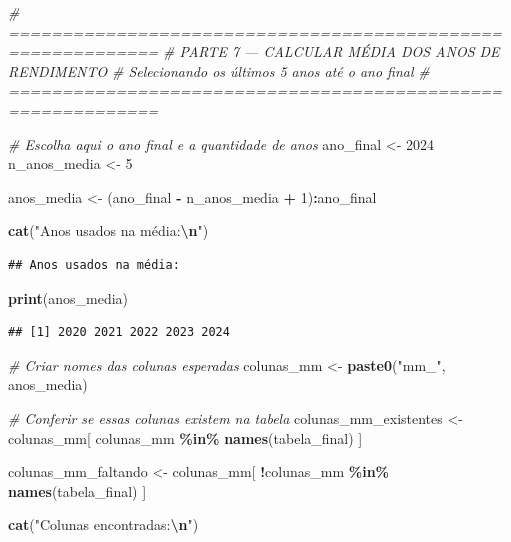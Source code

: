 \documentclass[
]{article}
\newenvironment{Shaded}{\begin{snugshade}}{\end{snugshade}}
\newcommand{\CommentTok}[1]{\textcolor[rgb]{0.56,0.35,0.01}{\textit{#1}}}
\newcommand{\DecValTok}[1]{\textcolor[rgb]{0.00,0.00,0.81}{#1}}
\newcommand{\FunctionTok}[1]{\textcolor[rgb]{0.13,0.29,0.53}{\textbf{#1}}}
\newcommand{\NormalTok}[1]{#1}
\newcommand{\OtherTok}[1]{\textcolor[rgb]{0.56,0.35,0.01}{#1}}
\newcommand{\SpecialCharTok}[1]{\textcolor[rgb]{0.81,0.36,0.00}{\textbf{#1}}}
\newcommand{\StringTok}[1]{\textcolor[rgb]{0.31,0.60,0.02}{#1}}
\begin{document}
\begin{Shaded}
\begin{Highlighting}[]
\CommentTok{\# ============================================================}
\CommentTok{\# PARTE 7 — CALCULAR MÉDIA DOS ANOS DE RENDIMENTO}
\CommentTok{\#            Selecionando os últimos 5 anos até o ano final}
\CommentTok{\# ============================================================}

\CommentTok{\# Escolha aqui o ano final e a quantidade de anos}
\NormalTok{ano\_final }\OtherTok{\textless{}{-}} \DecValTok{2024}
\NormalTok{n\_anos\_media }\OtherTok{\textless{}{-}} \DecValTok{5}

\NormalTok{anos\_media }\OtherTok{\textless{}{-}}\NormalTok{ (ano\_final }\SpecialCharTok{{-}}\NormalTok{ n\_anos\_media }\SpecialCharTok{+} \DecValTok{1}\NormalTok{)}\SpecialCharTok{:}\NormalTok{ano\_final}

\FunctionTok{cat}\NormalTok{(}\StringTok{"Anos usados na média:}\SpecialCharTok{\textbackslash{}n}\StringTok{"}\NormalTok{)}
\end{Highlighting}
\end{Shaded}

\begin{verbatim}
## Anos usados na média:
\end{verbatim}

\begin{Shaded}
\begin{Highlighting}[]
\FunctionTok{print}\NormalTok{(anos\_media)}
\end{Highlighting}
\end{Shaded}

\begin{verbatim}
## [1] 2020 2021 2022 2023 2024
\end{verbatim}

\begin{Shaded}
\begin{Highlighting}[]
\CommentTok{\# Criar nomes das colunas esperadas}
\NormalTok{colunas\_mm }\OtherTok{\textless{}{-}} \FunctionTok{paste0}\NormalTok{(}\StringTok{"mm\_"}\NormalTok{, anos\_media)}

\CommentTok{\# Conferir se essas colunas existem na tabela}
\NormalTok{colunas\_mm\_existentes }\OtherTok{\textless{}{-}}\NormalTok{ colunas\_mm[}
\NormalTok{  colunas\_mm }\SpecialCharTok{\%in\%} \FunctionTok{names}\NormalTok{(tabela\_final)}
\NormalTok{]}

\NormalTok{colunas\_mm\_faltando }\OtherTok{\textless{}{-}}\NormalTok{ colunas\_mm[}
  \SpecialCharTok{!}\NormalTok{colunas\_mm }\SpecialCharTok{\%in\%} \FunctionTok{names}\NormalTok{(tabela\_final)}
\NormalTok{]}

\FunctionTok{cat}\NormalTok{(}\StringTok{"Colunas encontradas:}\SpecialCharTok{\textbackslash{}n}\StringTok{"}\NormalTok{)}
\end{Highlighting}
\end{Shaded}
\end{document}
